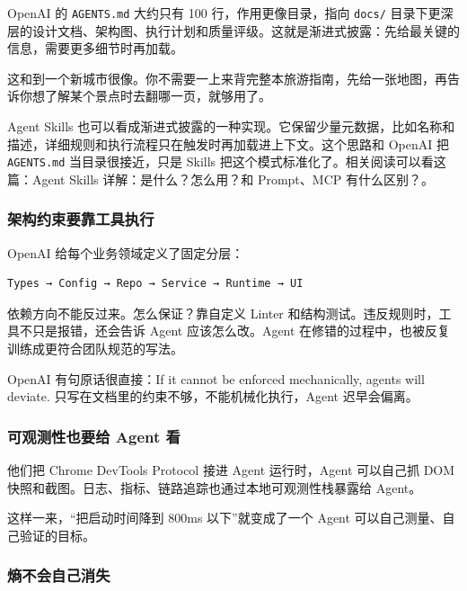 \documentclass[10pt,a4paper]{ctexart}
\begin{document}
OpenAI 的 \texttt{AGENTS.md} 大约只有 100 行，作用更像目录，指向 \texttt{docs/} 目录下更深层的设计文档、架构图、执行计划和质量评级。这就是渐进式披露：先给最关键的信息，需要更多细节时再加载。



这和到一个新城市很像。你不需要一上来背完整本旅游指南，先给一张地图，再告诉你想了解某个景点时去翻哪一页，就够用了。



Agent Skills 也可以看成渐进式披露的一种实现。它保留少量元数据，比如名称和描述，详细规则和执行流程只在触发时再加载进上下文。这个思路和 OpenAI 把 \texttt{AGENTS.md} 当目录很接近，只是 Skills 把这个模式标准化了。相关阅读可以看这篇：Agent Skills 详解：是什么？怎么用？和 Prompt、MCP 有什么区别？。



\subsubsection{架构约束要靠工具执行}


OpenAI 给每个业务领域定义了固定分层：



\begin{lstlisting}
Types → Config → Repo → Service → Runtime → UI
\end{lstlisting}



依赖方向不能反过来。怎么保证？靠自定义 Linter 和结构测试。违反规则时，工具不只是报错，还会告诉 Agent 应该怎么改。Agent 在修错的过程中，也被反复训练成更符合团队规范的写法。



OpenAI 有句原话很直接：If it cannot be enforced mechanically, agents will deviate. 只写在文档里的约束不够，不能机械化执行，Agent 迟早会偏离。



\subsubsection{可观测性也要给 Agent 看}


他们把 Chrome DevTools Protocol 接进 Agent 运行时，Agent 可以自己抓 DOM 快照和截图。日志、指标、链路追踪也通过本地可观测性栈暴露给 Agent。



这样一来，“把启动时间降到 800ms 以下”就变成了一个 Agent 可以自己测量、自己验证的目标。



\subsubsection{熵不会自己消失}
\end{document}
